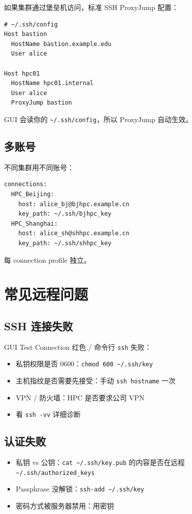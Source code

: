 如果集群通过堡垒机访问，标准 SSH ProxyJump 配置：

\begin{verbatim}
# ~/.ssh/config
Host bastion
  HostName bastion.example.edu
  User alice

Host hpc01
  HostName hpc01.internal
  User alice
  ProxyJump bastion
\end{verbatim}

\openbench{} GUI 会读你的 \texttt{\~{}/.ssh/config}，所以 ProxyJump 自动生效。

\subsection{多账号}

不同集群用不同账号：

\begin{verbatim}
connections:
  HPC_Beijing:
    host: alice_bj@bjhpc.example.cn
    key_path: ~/.ssh/bjhpc_key
  HPC_Shanghai:
    host: alice_sh@shhpc.example.cn
    key_path: ~/.ssh/shhpc_key
\end{verbatim}

每 connection profile 独立。

\section{常见远程问题}

\subsection{SSH 连接失败}

GUI Test Connection 红色 / 命令行 \texttt{ssh} 失败：

\begin{itemize}
  \item 私钥权限是否 0600：\texttt{chmod 600 \~{}/.ssh/key}
  \item 主机指纹是否需要先接受：手动 \texttt{ssh hostname} 一次
  \item VPN / 防火墙：HPC 是否要求公司 VPN
  \item 看 \texttt{ssh -vv} 详细诊断
\end{itemize}

\subsection{认证失败}

\begin{itemize}
  \item 私钥 vs 公钥：\texttt{cat \~{}/.ssh/key.pub} 的内容是否在远程 \texttt{\~{}/.ssh/authorized\_keys}
  \item Passphrase 没解锁：\texttt{ssh-add \~{}/.ssh/key}
  \item 密码方式被服务器禁用：用密钥
\end{itemize}

